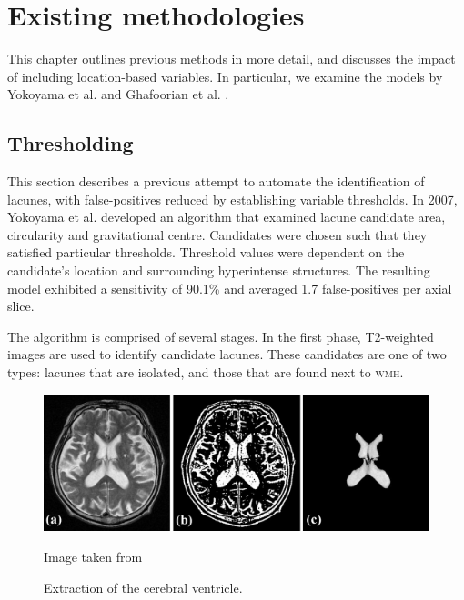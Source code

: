%
%

\chapter{Existing methodologies}\label{litrev}

This chapter outlines previous methods in more detail, and discusses the impact of including location-based variables. In particular, we examine the models by Yokoyama et al. \cite{Yokoyama2007} and Ghafoorian et al. \cite{GhafoorianM.2017Dml3}.

\section{Thresholding}\label{litrev-threshold}

This section describes a previous attempt to automate the identification of lacunes, with false-positives reduced by establishing variable thresholds. In 2007, Yokoyama et al. \cite{Yokoyama2007} developed an algorithm that examined lacune candidate area, circularity and gravitational centre. Candidates were chosen such that they satisfied particular thresholds. Threshold values were dependent on the candidate's location and surrounding hyperintense structures. The resulting model exhibited a sensitivity of 90.1\% and averaged 1.7 false-positives per axial slice.


The algorithm is comprised of several stages. In the first phase, T2-weighted images are used to identify candidate lacunes. These candidates are one of two types: lacunes that are isolated, and those that are found next to \textsc{wmh}.

\begin{figure}[ht]
	\centering
	\includegraphics[width=\textwidth]{Images/5_extract_ventricle.png}
	\caption{Extraction of the cerebral ventricle.}
	\small Image taken from \cite{Yokoyama2007}
\end{figure}

